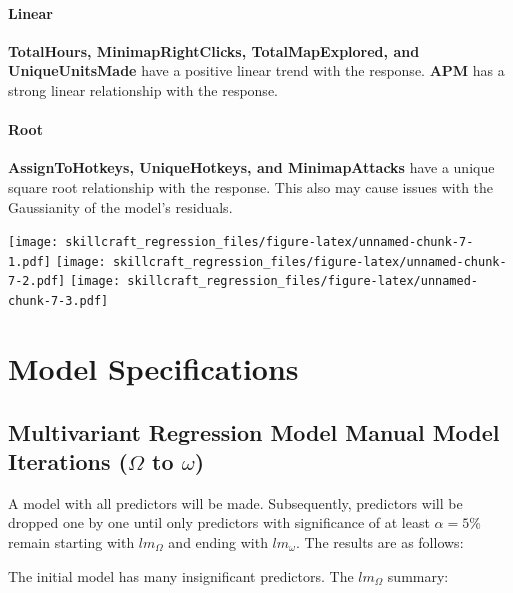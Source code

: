\documentclass[]{article}
\let\oldparagraph\paragraph
\renewcommand{\paragraph}[1]{\oldparagraph{#1}\mbox{}}
\begin{document}
\hypertarget{linear}{%
\paragraph{Linear}\label{linear}}

\textbf{TotalHours, MinimapRightClicks, TotalMapExplored, and
UniqueUnitsMade} have a positive linear trend with the response.
\textbf{APM} has a strong linear relationship with the response.

\hypertarget{root}{%
\paragraph{Root}\label{root}}

\textbf{AssignToHotkeys, UniqueHotkeys, and MinimapAttacks} have a
unique square root relationship with the response. This also may cause
issues with the Gaussianity of the model's residuals.

\texttt{[image: skillcraft\_regression\_files/figure-latex/unnamed-chunk-7-1.pdf]}
\texttt{[image: skillcraft\_regression\_files/figure-latex/unnamed-chunk-7-2.pdf]}
\texttt{[image: skillcraft\_regression\_files/figure-latex/unnamed-chunk-7-3.pdf]}

\hypertarget{model-specifications}{%
\section{Model Specifications}\label{model-specifications}}

\hypertarget{multivariant-regression-model-manual-model-iterations-omega-to-omega}{%
\subsection{\texorpdfstring{Multivariant Regression Model Manual Model
Iterations (\(\Omega\) to
\(\omega\))}{Multivariant Regression Model Manual Model Iterations (\textbackslash{}Omega to \textbackslash{}omega)}}\label{multivariant-regression-model-manual-model-iterations-omega-to-omega}}

A model with all predictors will be made. Subsequently, predictors will
be dropped one by one until only predictors with significance of at
least \(\alpha=5\%\) remain starting with \(lm_\Omega\) and ending with
\(lm_\omega\). The results are as follows:

The initial model has many insignificant predictors. The \(lm_\Omega\)
summary:
\end{document}
